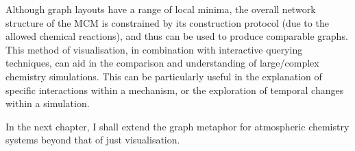 Although graph layouts have a range of local minima, the overall network structure of the MCM is constrained by its construction protocol (due to the allowed chemical reactions), and thus can be used to produce comparable graphs. This method of visualisation, in combination with interactive querying techniques, can aid in the comparison and understanding of large/complex chemistry simulations. This can be particularly useful in the explanation of specific interactions within a mechanism, or the exploration of temporal changes within a simulation. 

In the next chapter, I shall extend the graph metaphor for atmospheric chemistry systems beyond that of just visualisation. 
